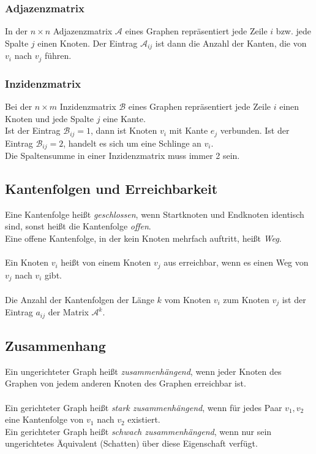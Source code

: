 \subsubsection{Adjazenzmatrix}
\label{ssub:adjazenzmatrix}
In der $n \times n$ Adjazenzmatrix $\mathcal{A}$ eines Graphen repräsentiert jede Zeile 
$i$ bzw. jede Spalte $j$ einen Knoten. Der Eintrag $\mathcal{A}_{ij}$ ist dann die 
Anzahl der Kanten, die von $v_i$ nach $v_j$ führen. 

\subsubsection{Inzidenzmatrix}
\label{ssub:inzidenzmatrix}

Bei der $n \times m$ Inzidenzmatrix $\mathcal{B}$ eines Graphen repräsentiert jede 
Zeile $i$ einen Knoten und jede Spalte $j$ eine Kante.\\
Ist der Eintrag $\mathcal{B}_{ij} = 1$, dann ist Knoten $v_i$ mit Kante $e_j$ verbunden. 
Ist der Eintrag $\mathcal{B}_{ij} = 2$, handelt es sich um eine Schlinge an $v_i$.\\
Die Spaltensumme in einer Inzidenzmatrix muss immer 2 sein.

\subsection{Kantenfolgen und Erreichbarkeit}
\label{sub:kantenfolgen_und_erreichbarkeit}

Eine Kantenfolge heißt \emph{geschlossen}, wenn Startknoten und Endknoten identisch sind, 
sonst heißt die Kantenfolge \emph{offen}.\\
Eine offene Kantenfolge, in der kein Knoten mehrfach auftritt, heißt \emph{Weg}.
\\\\
Ein Knoten $v_i$ heißt von einem Knoten $v_j$ aus erreichbar, wenn es einen Weg von
$v_j$ nach $v_i$ gibt.
\\\\
Die Anzahl der Kantenfolgen der Länge $k$ vom Knoten $v_i$ zum Knoten $v_j$ ist der
Eintrag $a_{ij}$ der Matrix $\mathcal{A}^k$.

\subsection{Zusammenhang}
\label{sub:zusammenhang}

Ein ungerichteter Graph heißt \emph{zusammenhängend}, wenn jeder Knoten des Graphen von 
jedem anderen Knoten des Graphen erreichbar ist.
\\\\
Ein gerichteter Graph heißt \emph{stark zusammenhängend}, wenn für jedes Paar $v_1, v_2$ 
eine Kantenfolge von $v_1$ nach $v_2$ existiert.\\
Ein gerichteter Graph heißt \emph{schwach zusammenhängend}, wenn nur sein ungerichtetes
Äquivalent (Schatten) über diese Eigenschaft verfügt. 

